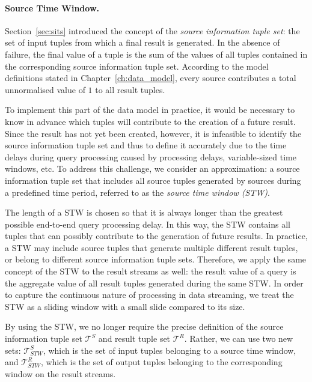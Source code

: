 \paragraph*{Source Time Window.}
\label{sec:stw}
Section~\ref{sec:sits} introduced the concept of the \emph{source information tuple set}: the set of
input tuples from which a final result is generated. In the absence of failure, the final \sic value of a
tuple is the sum of the \sic values of all tuples contained in the corresponding source information tuple
set.
According to the model definitions stated in Chapter~\ref{ch:data_model}, every source contributes a
total unnormalised \sic value of $1$ to all result tuples. 

To implement this part of the data model in practice, it would be necessary to know in advance which
tuples will contribute to the creation of a future result. Since the result has not yet been created,
however, it is infeasible to identify the source information tuple set and thus to define it accurately
due to the time delays during query processing caused by processing delays, variable-sized time windows,
etc.
To address this challenge, we consider an approximation: a source information tuple set that includes all
source tuples generated by sources during a predefined time period, referred to as the \emph{source time window (STW)}.

The length of a STW is chosen so that it is always longer than the greatest possible end-to-end query
processing delay.
In this way, the STW contains all tuples that can possibly contribute to the generation of future results.
In practice, a STW may include source tuples that generate multiple different result tuples, or
belong to different source information tuple sets.
Therefore, we apply the same concept of the STW to the result streams as well: the result \sic value of a
query is the aggregate \sic value of all result tuples generated during the same STW.
In order to capture the continuous nature of processing in data streaming, we treat the STW as a
sliding window with a small slide compared to its size.

By using the STW, we no longer require the precise definition of the source information tuple set
$\mathcal{T}^{S}$ and result tuple set $\mathcal{T}^{R}$. Rather, we can use two new sets:
$\mathcal{T}^{S}_{STW}$, which is the set of input tuples belonging to a source time window, and
$\mathcal{T}^{R}_{STW}$, which is the set of output tuples belonging to the corresponding window on
the result streams. 

